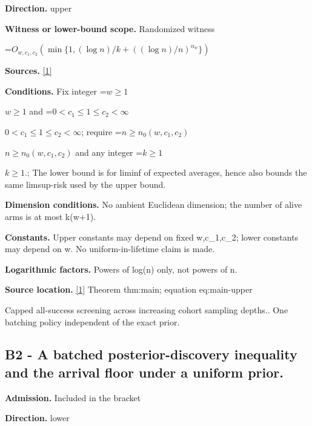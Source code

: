 \documentclass[10pt,a4paper]{article}
\newcommand{\AtlasMath}[1]{\par\begingroup\centering\setbox0=\hbox{$\displaystyle #1$}\ifdim\wd0>1.4\linewidth\typeout{ATLAS WIDE FORMULA: \the\wd0}\fi\ifdim\wd0>\linewidth\resizebox{\linewidth}{!}{\box0}\else\box0\fi\par\endgroup}
\newcommand{\AtlasInlineMath}[1]{\begingroup\setbox0=\hbox{$#1$}\ifdim\wd0>.4\linewidth\endgroup\AtlasMath{#1}\else\endgroup$#1$\fi}
\begin{document}
\textbf{Direction.} upper



\textbf{Witness or lower-bound scope.} Randomized witness



\AtlasMath{O_{w,c_1,c_2}\!\left(\min\{1,(\log n)/k+((\log n)/n)^{\alpha_w}\}\right)}


\textbf{Sources.} \href{https://github.com/WU-Wendao/Colombo/blob/main/colombo_sensorium/Complexity_altas/data/sources/colombo/U09/manuscript.pdf}{[1]}



\textbf{Conditions.} Fix integer \AtlasInlineMath{w\ge1} and \AtlasInlineMath{0<c_1\le1\le c_2<\infty}; require \AtlasInlineMath{n\ge n_0(w,c_1,c_2)} and any integer \AtlasInlineMath{k\ge1}.; The lower bound is for liminf of expected averages, hence also bounds the same limsup-risk used by the upper bound.



\textbf{Dimension conditions.} No ambient Euclidean dimension; the number of alive arms is at most k(w+1).



\textbf{Constants.} Upper constants may depend on fixed w,c\_1,c\_2; lower constants may depend on w. No uniform-in-lifetime claim is made.



\textbf{Logarithmic factors.} Powers of log(n) only, not powers of n.



\textbf{Source location.} \href{https://github.com/WU-Wendao/Colombo/blob/main/colombo_sensorium/Complexity_altas/data/sources/colombo/U09/manuscript.pdf}{[1]} Theorem thm:main; equation eq:main-upper



Capped all-success screening across increasing cohort sampling depths.. One batching policy independent of the exact prior.



\subsection{B2 - A batched posterior-discovery inequality and the arrival floor under a uniform prior.}


\textbf{Admission.} Included in the bracket



\textbf{Direction.} lower
\end{document}
